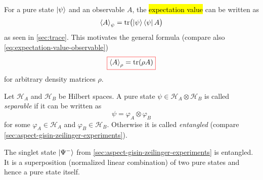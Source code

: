 For a pure state \(\ket{\psi}\) and an observable \(A\), the \hl{expectation value} can be written as
\[
\braket{A}_{\psi}
=
\operatorname{tr}\bigl(\ket{\psi}\bra{\psi}A\bigr)
\]
as seen in \autoref{sec:trace}.
This motivates the general formula (compare also \autoref{eq:expectation-value-observable})
\begin{equation}\label{eq:expectation-density-matrix}
{\color{red}\boxed{\color{black}
\braket{A}_{\rho}
=
\operatorname{tr}(\rho A)
}}
\end{equation}
for arbitrary density matrices \(\rho\).

\begin{definition}\label{def:separability-entanglement}
Let \(\mathcal H_A\) and \(\mathcal H_B\) be Hilbert spaces.
A pure state
\(
\psi \in \mathcal H_A \otimes \mathcal H_B
\)
is called \emph{separable} if it can be written as
\[
\psi = \varphi_A \otimes \varphi_B
\]
for some
\(
\varphi_A \in \mathcal H_A
\)
and
\(
\varphi_B \in \mathcal H_B
\).
Otherwise it is called \emph{entangled} (compare \autoref{sec:aspect-gisin-zeilinger-experiments}).
\end{definition}

\begin{example}\label{ex:singlet-state-entangled}
The singlet state $\ket{\Psi^-}$ from \autoref{sec:aspect-gisin-zeilinger-experiments}
is entangled.
It is a superposition (nor\-malized linear combination) of two pure states and hence a pure state itself.
\end{example}



